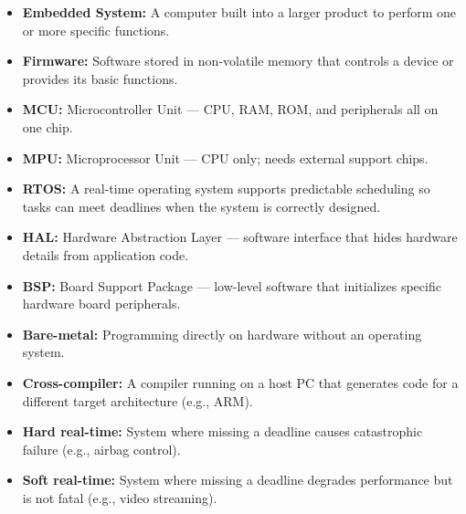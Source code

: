 \documentclass[12pt,a4paper]{article}
\begin{document}
\begin{tcolorbox}[defbox, title={\textbf{One-Line Definitions}}]
\begin{itemize}[leftmargin=*, itemsep=2.5pt, topsep=0pt]
  \item \textbf{Embedded System:} A computer built into a larger product to perform one or more specific functions.
  \item \textbf{Firmware:} Software stored in non-volatile memory that controls a device or provides its basic functions.
  \item \textbf{MCU:} Microcontroller Unit --- CPU, RAM, ROM, and peripherals all on one chip.
  \item \textbf{MPU:} Microprocessor Unit --- CPU only; needs external support chips.
  \item \textbf{RTOS:} A real-time operating system supports predictable scheduling so tasks can meet deadlines when the system is correctly designed.
  \item \textbf{HAL:} Hardware Abstraction Layer --- software interface that hides hardware details from application code.
  \item \textbf{BSP:} Board Support Package --- low-level software that initializes specific hardware board peripherals.
  \item \textbf{Bare-metal:} Programming directly on hardware without an operating system.
  \item \textbf{Cross-compiler:} A compiler running on a host PC that generates code for a different target architecture (e.g., ARM).
  \item \textbf{Hard real-time:} System where missing a deadline causes catastrophic failure (e.g., airbag control).
  \item \textbf{Soft real-time:} System where missing a deadline degrades performance but is not fatal (e.g., video streaming).
\end{itemize}
\end{tcolorbox}
\end{document}
